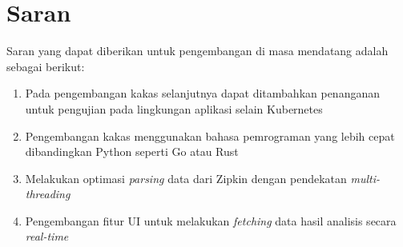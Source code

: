 \section{Saran}
Saran yang dapat diberikan untuk pengembangan di masa mendatang adalah sebagai berikut:
\begin{enumerate}
	\item Pada pengembangan kakas selanjutnya dapat ditambahkan penanganan untuk pengujian pada lingkungan aplikasi selain Kubernetes
	\item Pengembangan kakas menggunakan bahasa pemrograman yang lebih cepat dibandingkan Python seperti Go atau Rust
	\item Melakukan optimasi \textit{parsing} data dari Zipkin dengan pendekatan \textit{multi-threading}
	\item Pengembangan fitur UI untuk melakukan \textit{fetching} data hasil analisis secara \textit{real-time}
	

\end{enumerate}